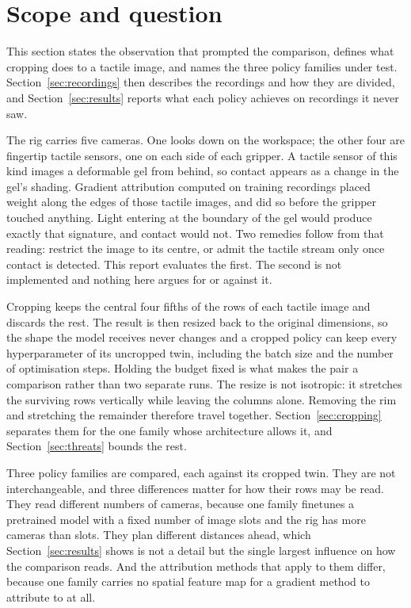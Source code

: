 \section{Scope and question}
\label{sec:scope}

This section states the observation that prompted the comparison, defines what
cropping does to a tactile image, and names the three policy families under
test. Section~\ref{sec:recordings} then describes the recordings and how they
are divided, and Section~\ref{sec:results} reports what each policy achieves on
recordings it never saw.

The rig carries five cameras. One looks down on the workspace; the other four
are fingertip tactile sensors, one on each side of each gripper. A tactile
sensor of this kind images a deformable gel from behind, so contact appears as
a change in the gel's shading. Gradient attribution computed on training
recordings placed weight along the edges of those tactile images, and did so
before the gripper touched anything. Light entering at the boundary of the gel
would produce exactly that signature, and contact would not. Two remedies
follow from that reading: restrict the image to its centre, or admit the
tactile stream only once contact is detected. This report evaluates the first.
The second is not implemented and nothing here argues for or against it.

Cropping keeps the central four fifths of the rows of each tactile image and
discards the rest. The result is then resized back to the original dimensions,
so the shape the model receives never changes and a cropped policy can keep
every hyperparameter of its uncropped twin, including the batch size and the
number of optimisation steps. Holding the budget fixed is what makes the pair a
comparison rather than two separate runs. The resize is not isotropic: it
stretches the surviving rows vertically while leaving the columns alone.
Removing the rim and stretching the remainder therefore travel together.
Section~\ref{sec:cropping} separates them for the one family whose
architecture allows it, and Section~\ref{sec:threats} bounds the rest.

Three policy families are compared, each against its cropped twin. They are not
interchangeable, and three differences matter for how their rows may be read.
They read different numbers of cameras, because one family finetunes a
pretrained model with a fixed number of image slots and the rig has more
cameras than slots. They plan different distances ahead, which
Section~\ref{sec:results} shows is not a detail but the single largest
influence on how the comparison reads. And the attribution methods that apply
to them differ, because one family carries no spatial feature map for a
gradient method to attribute to at all.
